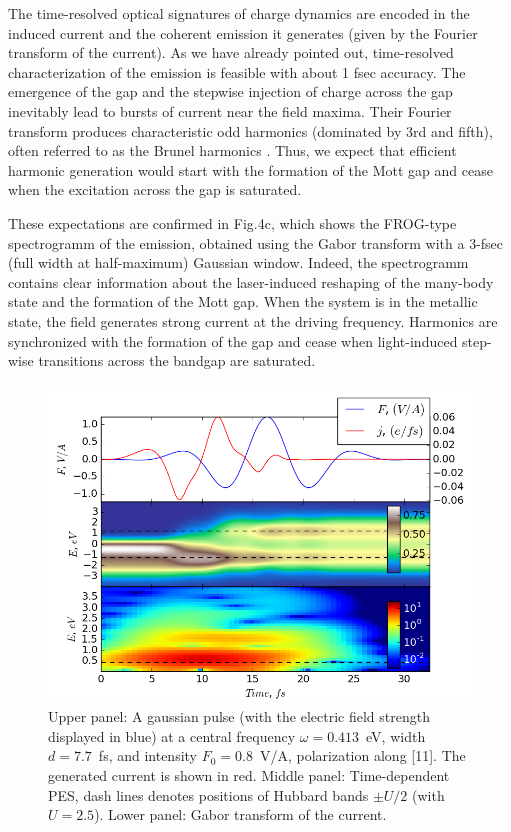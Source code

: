 \documentclass[prb,aps,twocolumn,showpacs,amsmath,amssymb]{revtex4}%
\begin{document}
The time-resolved optical signatures of charge dynamics are
encoded in the induced current and the 
coherent emission it generates (given 
by the Fourier transform of the current). As we have
already pointed out, time-resolved characterization of
the emission is feasible with about 1 fsec accuracy.
The emergence of the gap and the stepwise injection of
charge  across the gap inevitably lead to bursts
of current near the field maxima. Their Fourier transform
produces characteristic odd harmonics (dominated by
3rd and fifth), often referred to
as the Brunel harmonics \cite{Burnett_1989}. Thus, we expect that
efficient harmonic generation would start
with the formation of the Mott gap and cease when the 
excitation across the gap is saturated. 

These expectations
are confirmed in Fig.4c, which shows the FROG-type 
spectrogramm  of the emission, obtained using the Gabor transform
with a 3-fsec (full width at half-maximum) Gaussian 
window.   Indeed, the spectrogramm contains 
clear information about the laser-induced reshaping of
the many-body state and the formation of the Mott gap. 
When the system is in the metallic state, the field
generates strong current at the driving frequency. 
Harmonics are synchronized with the formation of
the gap and cease when light-induced step-wise transitions
across the bandgap are saturated. 


\begin{figure}[h!]
 \includegraphics[width=1.0\linewidth,angle=0]{HHGw04lco8e9u25.png}
\caption{Upper panel: A gaussian pulse 
(with the electric field strength displayed in blue) at a central frequency $\omega=0.413$~eV, width $d=7.7$~fs, and intensity $F_{0}=0.8$~V/A, polarization along [11].  The generated current is shown in red.  Middle panel: Time-dependent PES, dash lines denotes positions of Hubbard bands $\pm U/2$ (with $U=2.5$). Lower panel: Gabor transform of the current.}
\label{Fig4}  
\end{figure}
\end{document}
